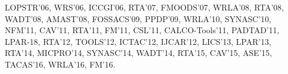 LOPSTR'06, WRS'06, ICCGI'06, RTA'07, FMOODS'07, WRLA'08, RTA'08, WADT'08, AMAST'08, FOSSACS'09, PPDP'09, WRLA'10, SYNASC'10, NFM'11, CAV'11, RTA'11, FM'11, CSL'11, CALCO-Tools'11, PADTAD'11, LPAR-18, RTA'12, TOOLS'12, ICTAC'12, IJCAR'12, LICS'13, LPAR'13, RTA'14, MICPRO'14, SYNASC'14, WADT'14, RTA'15, CAV'15, ASE'15, TACAS'16, WRLA'16, FM'16.
